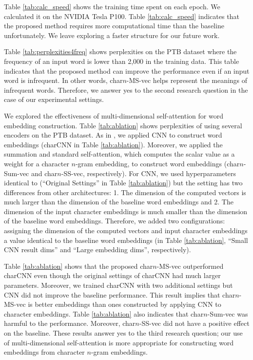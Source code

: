 \documentclass[letterpaper]{article} %
\begin{document}
Table \ref{tab:calc_speed} shows the training time spent on each epoch.
We calculated it on the NVIDIA Tesla P100.
Table \ref{tab:calc_speed} indicates that the proposed method requires more computational time than the baseline unfortunately.
We leave exploring a faster structure for our future work.


Table \ref{tab:perplexities4freq} shows perplexities on the PTB dataset where the frequency of an input word is lower than 2,000 in the training data.
This table indicates that the proposed method can improve the performance even if an input word is infrequent.
In other words, char$n$-MS-vec helps represent the meanings of infrequent words.
Therefore, we answer yes to the second research question in the case of our experimental settings.


We explored the effectiveness of multi-dimensional self-attention for word embedding construction.
Table \ref{tab:ablation} shows perplexities of using several encoders on the PTB dataset.
As in \cite{Kim:2016:CNL:3016100.3016285}, we applied CNN to construct word embeddings (charCNN in Table \ref{tab:ablation}).
Moreover, we applied the summation and standard self-attention, which computes the scalar value as a weight for a character $n$-gram embedding, to construct word embeddings (char$n$-Sum-vec and char$n$-SS-vec, respectively).
For CNN, we used hyperparameters identical to \cite{Kim:2016:CNL:3016100.3016285} (``Original Settings'' in Table \ref{tab:ablation}) but the setting has two differences from other architectures: 1. The dimension of the computed vectors is much larger than the dimension of the baseline word embeddings and 2. The dimension of the input character embeddings is much smaller than the dimension of the baseline word embeddings.
Therefore, we added two configurations: assigning the dimension of the computed vectors and input character embeddings a value identical to the baseline word embeddings (in Table \ref{tab:ablation}, ``Small CNN result dims'' and ``Large embedding dims'', respectively).



Table \ref{tab:ablation} shows that the proposed char$n$-MS-vec outperformed charCNN even though the original settings of charCNN had much larger parameters.
Moreover, we trained charCNN with two additional settings but CNN did not improve the baseline performance.
This result implies that char$n$-MS-vec is better embeddings than ones constructed by applying CNN to character embeddings.
Table \ref{tab:ablation} also indicates that char$n$-Sum-vec was harmful to the performance.
Moreover, char$n$-SS-vec did not have a positive effect on the baseline.
These results answer yes to the third research question; our use of multi-dimensional self-attention is more appropriate for constructing word embeddings from character $n$-gram embeddings.
\end{document}
